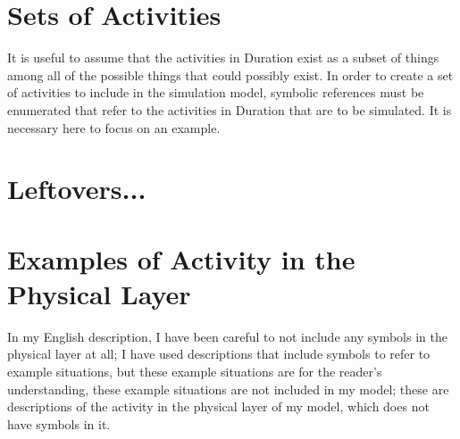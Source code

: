 \section{Sets of Activities}

It is useful to assume that the activities in Duration exist as a
subset of things among all of the possible things that could possibly
exist.  In order to create a set of activities to include in the
simulation model, symbolic references must be enumerated that refer to
the activities in Duration that are to be simulated.  It is necessary
here to focus on an example.


\section{Leftovers...}

\section{Examples of Activity in the Physical Layer}

In my English description, I have been careful to not include any
symbols in the physical layer at all; I have used descriptions that
include symbols to refer to example situations, but these example
situations are for the reader's understanding, these example
situations are not included in my model; these are descriptions of the
activity in the physical layer of my model, which does not have
symbols in it.
